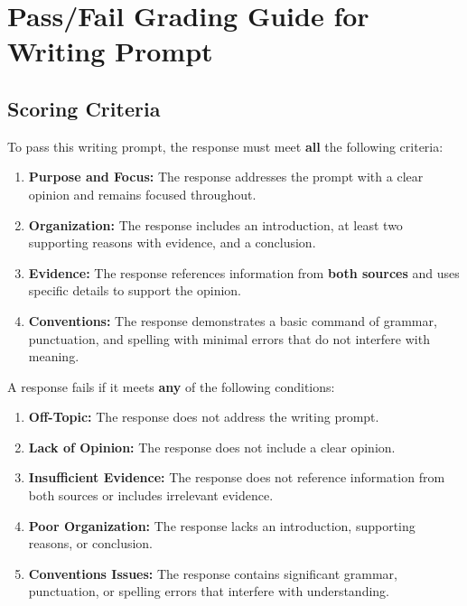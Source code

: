 \documentclass[12pt]{article}
\begin{document}
\section*{Pass/Fail Grading Guide for Writing Prompt}

\subsection*{Scoring Criteria}

\begin{tcolorbox}[colframe=black!40, colback=gray!5, title=Pass Criteria]
To pass this writing prompt, the response must meet \textbf{all} the following criteria:
\begin{enumerate}
    \item \textbf{Purpose and Focus:} The response addresses the prompt with a clear opinion and remains focused throughout.
    \item \textbf{Organization:} The response includes an introduction, at least two supporting reasons with evidence, and a conclusion.
    \item \textbf{Evidence:} The response references information from \textbf{both sources} and uses specific details to support the opinion.
    \item \textbf{Conventions:} The response demonstrates a basic command of grammar, punctuation, and spelling with minimal errors that do not interfere with meaning.
\end{enumerate}
\end{tcolorbox}

\begin{tcolorbox}[colframe=black!40, colback=red!5, title=Fail Criteria]
A response fails if it meets \textbf{any} of the following conditions:
\begin{enumerate}
    \item \textbf{Off-Topic:} The response does not address the writing prompt.
    \item \textbf{Lack of Opinion:} The response does not include a clear opinion.
    \item \textbf{Insufficient Evidence:} The response does not reference information from both sources or includes irrelevant evidence.
    \item \textbf{Poor Organization:} The response lacks an introduction, supporting reasons, or conclusion.
    \item \textbf{Conventions Issues:} The response contains significant grammar, punctuation, or spelling errors that interfere with understanding.
\end{enumerate}
\end{tcolorbox}
\end{document}
